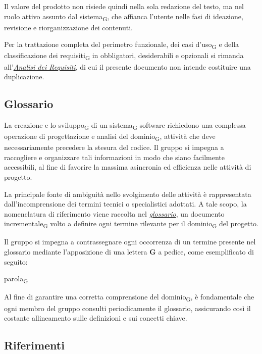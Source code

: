 \documentclass[a4paper, 10pt]{article}
\begin{document}
Il valore del prodotto non risiede quindi nella sola redazione del testo, ma nel ruolo attivo assunto dal sistema\textsubscript{G}, che affianca l'utente nelle fasi di ideazione, revisione e riorganizzazione dei contenuti.

Per la trattazione completa del perimetro funzionale, dei casi d'uso\textsubscript{G} e della classificazione dei requisiti\textsubscript{G} in obbligatori, desiderabili e opzionali si rimanda all'\href{https://thebitless.live/PB/doc_esterna/analisi-dei-requisiti/analisi-dei-requisiti.pdf}{\textit{Analisi dei Requisiti}}, di cui il presente documento non intende costituire una duplicazione.

\subsection{Glossario}
\label{sec:glossario}
La creazione e lo sviluppo\textsubscript{G} di un sistema\textsubscript{G} software richiedono una complessa operazione di progettazione e analisi del dominio\textsubscript{G}, attività che deve necessariamente precedere la stesura del codice. Il gruppo si impegna a raccogliere e organizzare tali informazioni in modo che siano facilmente accessibili, al fine di favorire la massima asincronia ed efficienza nelle attività di progetto.

La principale fonte di ambiguità nello svolgimento delle attività è rappresentata dall'incomprensione dei termini tecnici o specialistici adottati. A tale scopo, la nomenclatura di riferimento viene raccolta nel \href{https://thebitless.live/PB/doc_interna/glossario/glossario.pdf}{\textit{glossario}}, un documento incrementale\textsubscript{G} volto a definire ogni termine rilevante per il dominio\textsubscript{G} del progetto.

Il gruppo si impegna a contrassegnare ogni occorrenza di un termine presente nel glossario mediante l'apposizione di una lettera \textbf{G} a pedice, come esemplificato di seguito:

\noindent parola\textsubscript{G}

Al fine di garantire una corretta comprensione del dominio\textsubscript{G}, è fondamentale che ogni membro del gruppo consulti periodicamente il glossario, assicurando così il costante allineamento sulle definizioni e sui concetti chiave.

\subsection{Riferimenti}
\label{sec:riferimenti}
\end{document}
